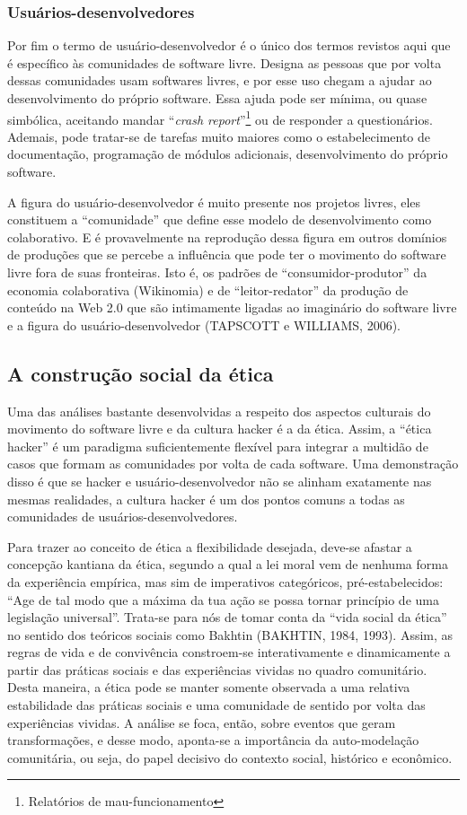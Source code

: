 \subsubsection{Usuários-desenvolvedores} \label{2.1.1.c}

Por fim o termo de usuário-desenvolvedor é o único dos termos revistos aqui que é específico às comunidades de software livre. Designa as pessoas que por volta dessas comunidades usam softwares livres, e por esse uso chegam a ajudar ao desenvolvimento do próprio software. Essa ajuda pode ser mínima, ou quase simbólica, aceitando mandar “\emph{crash report}”\footnote{Relatórios de mau-funcionamento} ou de responder a questionários. Ademais, pode tratar-se de tarefas muito maiores como o estabelecimento de documentação, programação de módulos adicionais, desenvolvimento do próprio software.

A figura do usuário-desenvolvedor é muito presente nos projetos livres, eles constituem a “comunidade” que define esse modelo de desenvolvimento como colaborativo. E é provavelmente na reprodução dessa figura em outros domínios de produções que se percebe a influência que pode ter o movimento do software livre fora de suas fronteiras. Isto é, os padrões de “consumidor-produtor” da economia colaborativa (Wikinomia) e de “leitor-redator” da produção de conteúdo na Web 2.0 que são intimamente ligadas ao imaginário do software livre e a figura do usuário-desenvolvedor (TAPSCOTT e WILLIAMS, 2006).

\subsection{A construção social da ética} \label{2.1.2}

Uma das análises bastante desenvolvidas a respeito dos aspectos culturais do movimento do software livre e da cultura hacker é a da ética. Assim, a “ética hacker” é um paradigma suficientemente flexível para integrar a multidão de casos que formam as comunidades por volta de cada software. Uma demonstração disso é que se hacker e usuário-desenvolvedor não se alinham exatamente nas mesmas realidades, a cultura hacker é um dos pontos comuns a todas as comunidades de usuários-desenvolvedores.

Para trazer ao conceito de ética a flexibilidade desejada, deve-se afastar a concepção kantiana da ética, segundo a qual a lei moral vem de nenhuma forma da experiência empírica, mas sim de imperativos categóricos, pré-estabelecidos: “Age de tal modo que a máxima da tua ação se possa tornar princípio de uma legislação universal”. Trata-se para nós de tomar conta da “vida social da ética” no sentido dos teóricos sociais como Bakhtin (BAKHTIN, 1984, 1993). Assim, as regras de vida e de convivência constroem-se interativamente e dinamicamente a partir das práticas sociais e das experiências vividas no quadro comunitário. Desta maneira, a ética pode se manter somente observada a uma relativa estabilidade das práticas sociais e uma comunidade de sentido por volta das experiências vividas. A análise se foca, então, sobre eventos que geram transformações, e desse modo, aponta-se a importância da auto-modelação comunitária, ou seja, do papel decisivo do contexto social, histórico e econômico. 

